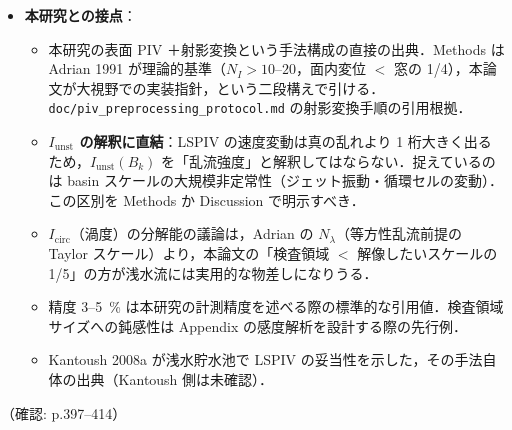 \documentclass[11pt]{jsarticle}
\begin{document}
\begin{itemize}
  \item \textbf{本研究との接点}：
  \begin{itemize}
    \item 本研究の表面 PIV ＋射影変換という手法構成の直接の出典．Methods は Adrian 1991 が理論的基準（$N_I > 10$--$20$，面内変位 $<$ 窓の 1/4），本論文が大視野での実装指針，という二段構えで引ける．\texttt{doc/piv\_preprocessing\_protocol.md} の射影変換手順の引用根拠．
    \item \textbf{$I_\mathrm{unst}$ の解釈に直結}：LSPIV の速度変動は真の乱れより 1 桁大きく出るため，$I_\mathrm{unst}(B_k)$ を「乱流強度」と解釈してはならない．捉えているのは basin スケールの大規模非定常性（ジェット振動・循環セルの変動）．この区別を Methods か Discussion で明示すべき．
    \item $I_\mathrm{circ}$（渦度）の分解能の議論は，Adrian の $N_\lambda$（等方性乱流前提の Taylor スケール）より，本論文の「検査領域 $<$ 解像したいスケールの 1/5」の方が浅水流には実用的な物差しになりうる．
    \item 精度 3--5~\% は本研究の計測精度を述べる際の標準的な引用値．検査領域サイズへの鈍感性は Appendix の感度解析を設計する際の先行例．
    \item Kantoush 2008a が浅水貯水池で LSPIV の妥当性を示した，その手法自体の出典（Kantoush 側は未確認）．
  \end{itemize}
\end{itemize}
\noindent（確認: p.397--414）
\end{document}
